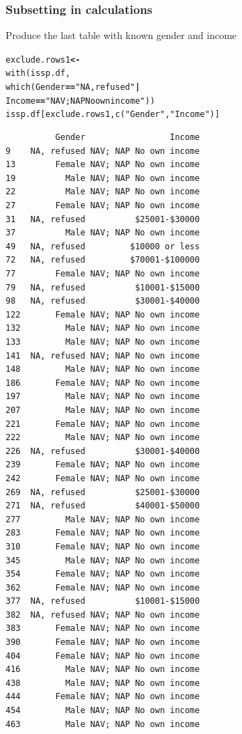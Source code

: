 \documentclass{beamer}\usepackage[]{graphicx}\usepackage[]{color}
\makeatletter
\newcommand{\hlstr}[1]{\textcolor[rgb]{0.667,0.267,0}{#1}}%
\newcommand{\hlopt}[1]{\textcolor[rgb]{0,0,0}{\textbf{#1}}}%
\newcommand{\hlstd}[1]{\textcolor[rgb]{0,0,0}{#1}}%
\newcommand{\hlkwb}[1]{\textcolor[rgb]{0,0,0.4}{\textbf{#1}}}%
\newcommand{\hlkwd}[1]{\textcolor[rgb]{0,0.267,0.4}{#1}}%
\newenvironment{kframe}{%
 \def\at@end@of@kframe{}%
 \ifinner\ifhmode%
  \def\at@end@of@kframe{\end{minipage}}%
  \begin{minipage}{\columnwidth}%
 \fi\fi%
 \def\FrameCommand##1{\hskip\@totalleftmargin \hskip-\fboxsep
 \colorbox{shadecolor}{##1}\hskip-\fboxsep
     \hskip-\linewidth \hskip-\@totalleftmargin \hskip\columnwidth}%
 \MakeFramed {\advance\hsize-\width
   \@totalleftmargin\z@ \linewidth\hsize
   \@setminipage}}%
 {\par\unskip\endMakeFramed%
 \at@end@of@kframe}
\newenvironment{knitrout}{}{} %
\makeatother
\begin{document}
\begin{frame}[fragile]
\frametitle{Subsetting in calculations} 
Produce the last table with known gender and income

\begin{knitrout}
\color{fgcolor}\begin{kframe}
\begin{alltt}
\hlstd{exclude.rows1} \hlkwb{<-}
  \hlkwd{with}\hlstd{(issp.df,}
     \hlkwd{which}\hlstd{(Gender} \hlopt{==} \hlstr{"NA, refused"}  \hlopt{|}
           \hlstd{Income} \hlopt{==} \hlstr{"NAV; NAP No own income"}\hlstd{))}
\hlstd{issp.df[exclude.rows1,} \hlkwd{c}\hlstd{(}\hlstr{"Gender"}\hlstd{,} \hlstr{"Income"}\hlstd{)]}
\end{alltt}
\begin{verbatim}
          Gender                 Income
9    NA, refused NAV; NAP No own income
13        Female NAV; NAP No own income
19          Male NAV; NAP No own income
22          Male NAV; NAP No own income
27        Female NAV; NAP No own income
31   NA, refused          $25001-$30000
37          Male NAV; NAP No own income
49   NA, refused         $10000 or less
72   NA, refused         $70001-$100000
77        Female NAV; NAP No own income
79   NA, refused          $10001-$15000
98   NA, refused          $30001-$40000
122       Female NAV; NAP No own income
132         Male NAV; NAP No own income
133         Male NAV; NAP No own income
141  NA, refused NAV; NAP No own income
148         Male NAV; NAP No own income
186       Female NAV; NAP No own income
197         Male NAV; NAP No own income
207         Male NAV; NAP No own income
221       Female NAV; NAP No own income
222         Male NAV; NAP No own income
226  NA, refused          $30001-$40000
239       Female NAV; NAP No own income
242       Female NAV; NAP No own income
269  NA, refused          $25001-$30000
271  NA, refused          $40001-$50000
277         Male NAV; NAP No own income
283       Female NAV; NAP No own income
310       Female NAV; NAP No own income
345         Male NAV; NAP No own income
354       Female NAV; NAP No own income
362       Female NAV; NAP No own income
377  NA, refused          $10001-$15000
382  NA, refused NAV; NAP No own income
383       Female NAV; NAP No own income
390       Female NAV; NAP No own income
404       Female NAV; NAP No own income
416         Male NAV; NAP No own income
438         Male NAV; NAP No own income
444       Female NAV; NAP No own income
454         Male NAV; NAP No own income
463         Male NAV; NAP No own income

\end{verbatim}
\end{kframe}
\end{knitrout}
\end{frame}
\end{document}
